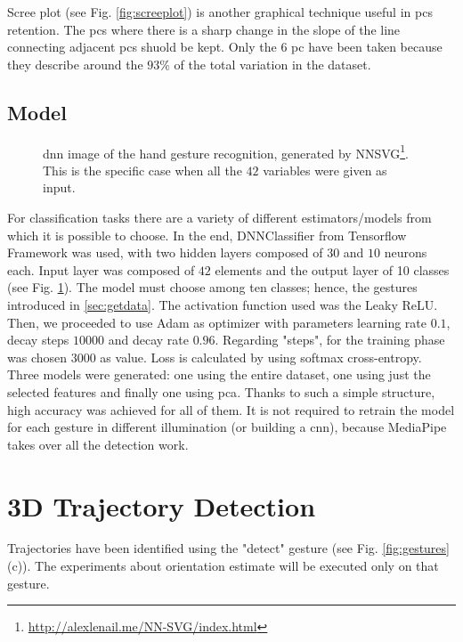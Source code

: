 \noindent Scree plot (see Fig. \ref{fig:screeplot}) is another graphical technique useful in \glspl{pc} retention. The \glspl{pc} where there is a sharp change in the slope of the line connecting adjacent \glspl{pc} shuold be kept. Only the $6$ \gls{pc} have been taken because they describe around the $93\%$ of the total variation in the dataset.

\subsection{Model}
\label{sec:model}

\begin{figure}[H]
	\caption[Hand gesture reconognition \gls{nn}.] {\gls{dnn} image of the hand gesture recognition, generated by NNSVG\footnote{\url{http://alexlenail.me/NN-SVG/index.html}}. This is the specific case when all the $42$ variables were given as input.}
	\label{fig:handarch}
\end{figure}

For classification tasks there are a variety of different estimators/models from which it is possible to choose. In the end, DNNClassifier from Tensorflow Framework was used, with two hidden layers composed of $30$ and $10$ neurons each. Input layer was composed of $42$ elements and the output layer of 10 classes (see Fig. \ref{fig:handarch}). The model must choose among ten classes; hence, the gestures introduced in \ref{sec:getdata}. The activation function used was the Leaky ReLU. Then, we proceeded to use Adam as optimizer with parameters learning rate $0.1$, decay steps $10000$ and decay rate $0.96$. Regarding "steps", for the training phase was chosen $3000$ as value. Loss is calculated by using softmax cross-entropy. \\


\noindent Three models were generated: one using the entire dataset, one using just the selected features and finally one using \gls{pca}. Thanks to such a simple structure, high accuracy was achieved for all of them. It is not required to retrain the model for each gesture in different illumination (or building a \gls{cnn}), because MediaPipe takes over all the detection work.

\section{3D Trajectory Detection}
\label{sec:3dtraj}
Trajectories have been identified using the "detect" gesture (see Fig. \ref{fig:gestures} (c)). The experiments about orientation estimate will be executed only on that gesture. 

